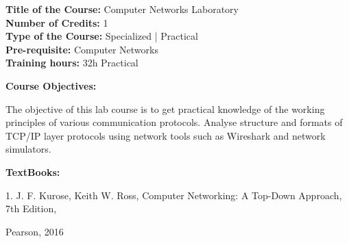 \documentclass[12pt,a4paper]{article}
\begin{document}
\newpage
\textbf{Title of the Course:} Computer Networks Laboratory\\
\textbf{Number of Credits:} 1\\
\textbf{Type of the Course:} Specialized | Practical\\
\textbf{Pre-requisite:} Computer Networks\\
\textbf{Training hours:} 32h Practical\par\vspace{4pt}
\textbf{Course Objectives:}\par\vspace{2pt}
The objective of this lab course is to get practical knowledge of the working principles of various
communication protocols. Analyse structure and formats of TCP/IP layer protocols using network
tools such as Wireshark and network simulators.\par\vspace{4pt}
\textbf{TextBooks:}\par\vspace{2pt}
1. J. F. Kurose, Keith W. Ross, Computer Networking: A Top-Down Approach, 7th Edition,\par
Pearson, 2016\par
\vspace{4pt}
\end{document}
